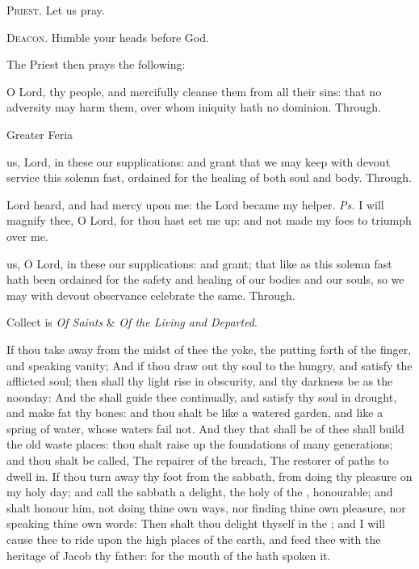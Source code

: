 \textsc{Priest.} Let us pray.\par
\textsc{Deacon.} Humble your heads before God.\par
\begin{rubric}
    The Priest then prays the following:
\end{rubric}
 O Lord, thy people, and mercifully cleanse them from all their sins: that no adversity may harm them, over whom iniquity hath no dominion. Through.


\begin{inhead}
    {Greater Feria}
\end{inhead}


 us, Lord, in these our supplications: and grant that we may keep with devout service this solemn fast, ordained for the healing of both soul and body. Through.

\introit
{} Lord heard, and had mercy upon me: the Lord became my helper. \textit{Ps.} I will magnify thee, O Lord, for thou hast set me up: and not made my foes to triumph over me.

\collect
{} us, O Lord, in these our supplications: and grant; that like as this solemn fast hath been ordained for the safety and healing of our bodies and our souls, so we may with devout observance celebrate the same. Through.

\begin{rubric}
     Collect is \emph{Of Saints} \&  \emph{Of the Living and Departed}.
\end{rubric}

 If thou take away from the midst of thee the yoke, the putting forth of the finger, and speaking vanity; And if thou draw out thy soul to the hungry, and satisfy the afflicted soul; then shall thy light rise in obscurity, and thy darkness be as the noonday: And the  shall guide thee continually, and satisfy thy soul in drought, and make fat thy bones: and thou shalt be like a watered garden, and like a spring of water, whose waters fail not. And they that shall be of thee shall build the old waste places: thou shalt raise up the foundations of many generations; and thou shalt be called, The repairer of the breach, The restorer of paths to dwell in. If thou turn away thy foot from the sabbath, from doing thy pleasure on my holy day; and call the sabbath a delight, the holy of the , honourable; and shalt honour him, not doing thine own ways, nor finding thine own pleasure, nor speaking thine own words: Then shalt thou delight thyself in the ; and I will cause thee to ride upon the high places of the earth, and feed thee with the heritage of Jacob thy father: for the mouth of the  hath spoken it.

